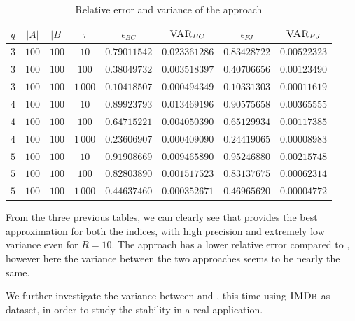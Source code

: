 \begin{table}[h]
	\centering
	\begin{tabular}{|c|c|c|c|c|c|c|c|}
		\hline
		$q$ & $|A|$ & $|B|$ & $\tau$      & $\epsilon_{BC}$ & $\textsc{VAR}_{BC}$ & $\epsilon_{FJ}$ & $\textsc{VAR}_{FJ}$ \\ \hline \hline
		$3$ & $100$ & $100$ & $10$     & $0.79011542$    & $0.023361286$       & $0.83428722$    & $0.00522323$        \\ \hline
		$3$ & $100$ & $100$ & $100$    & $0.38049732$    & $0.003518397$       & $0.40706656$    & $0.00123490$        \\ \hline
		$3$ & $100$ & $100$ & $1\,000$ & $0.10418507$    & $0.000494349$       & $0.10331303$    & $0.00011619$        \\ \hline \hline
		$4$ & $100$ & $100$ & $10$     & $0.89923793$    & $0.013469196$       & $0.90575658$    & $0.00365555$        \\ \hline
		$4$ & $100$ & $100$ & $100$    & $0.64715221$    & $0.004050390$       & $0.65129934$    & $0.00117385$        \\ \hline
		$4$ & $100$ & $100$ & $1\,000$ & $0.23606907$    & $0.000409090$       & $0.24419065$    & $0.00008983$        \\ \hline \hline
		$5$ & $100$ & $100$ & $10$     & $0.91908669$    & $0.009465890$       & $0.95246880$    & $0.00215748$        \\ \hline
		$5$ & $100$ & $100$ & $100$    & $0.82803890$    & $0.001517523$       & $0.83137675$    & $0.00062314$        \\ \hline
		$5$ & $100$ & $100$ & $1\,000$ & $0.44637460$    & $0.000352671$       & $0.46965620$    & $0.00004772$        \\ \hline
	\end{tabular}
	\caption{Relative error and variance of the \base approach}	
\end{table}

\clearpage

From the three previous tables, we can clearly see that \fcount provides the best approximation for both the indices, 
with high precision and extremely low variance even for $R=10$. 
The \fsamp approach has a lower relative error compared to \base, however here the variance between the two approaches seems to be nearly the same.\medskip

We further investigate the variance between \fsamp and \base, this time using $\textsc{IMDb}$ as dataset,
in order to study the stability in a real application.

